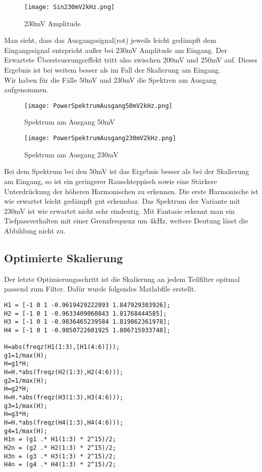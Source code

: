 \begin{figure}[H]
  \centering
    \texttt{[image: Sin230mV2kHz.png]}
  \caption{230mV Amplitude}
  \label{fig:Sin230mV2kHz}
\end{figure}
Man sieht, dass das Ausgangssignal(rot) jeweils leicht gedämpft dem Eingangssignal entspricht außer bei 230mV Amplitude am Eingang. Der Erwartete Übersteuerungseffekt tritt also zwischen 200mV und 250mV auf. Dieses Ergebnis ist bei weitem besser als im Fall der Skalierung am Eingang.\\
Wir haben für die Fälle 50mV und 230mV die Spektren am Ausgang aufgenommen.\\
\begin{figure}[H]
  \centering
    \texttt{[image: PowerSpektrumAusgang50mV2kHz.png]}
  \caption{Spektrum am Ausgang 50mV}
  \label{fig:PowerSpektrumAusgang50mV2kHz}
\end{figure}
\begin{figure}[H]
  \centering
    \texttt{[image: PowerSpektrumAusgang230mV2kHz.png]}
  \caption{Spektrum am Ausgang 230mV}
  \label{fig:PowerSpektrumAusgang230mV2kHz}
\end{figure}
Bei dem Spektrum bei den 50mV ist das Ergebnis besser als bei der Skalierung am Eingang, so ist ein geringerer Rauschteppisch sowie eine Stärkere Unterdrückung der höheren Harmonischen zu erkennen. Die erste Harmonische ist wie erwartet leicht gedämpft gut erkennbar. Das Spektrum der Variante mit 230mV ist wie erwartet nicht sehr eindeutig. Mit Fantasie erkennt man ein Tiefpassverhalten mit einer Grenzfrequenz um 4kHz, weitere Deutung lässt die Abbildung nicht zu.

\subsection{Optimierte Skalierung}
Der letzte Optimierungsschritt ist die Skalierung an jedem Teilfilter opitmal passend zum Filter.
Dafür wurde folgendes Matlabfile erstellt.\\
\begin{adjustbox}{width=\textwidth,height=\textheight,keepaspectratio}
 \begin{lstlisting}[title=optimierung.m]
 H1 = [-1 0 1 -0.9619429222893 1.847929303926];
H2 = [-1 0 1 -0.9633409060843 1.81768444585];
H3 = [-1 0 1 -0.9836465239584 1.819862361978];
H4 = [-1 0 1 -0.9850722601925 1.806715933748];

H=abs(freqz(H1(1:3),[H1(4:6)]));
g1=1/max(H);
H=g1*H;
H=H.*abs(freqz(H2(1:3),H2(4:6)));
g2=1/max(H);
H=g2*H;
H=H.*abs(freqz(H3(1:3),H3(4:6)));
g3=1/max(H);
H=g3*H;
H=H.*abs(freqz(H4(1:3),H4(4:6)));
g4=1/max(H);
H1n = (g1 .* H1(1:3) * 2^15)/2;
H2n = (g2 .* H2(1:3) * 2^15)/2;
H3n = (g3 .* H3(1:3) * 2^15)/2;
H4n = (g4 .* H4(1:3) * 2^15)/2;
\end{lstlisting}
\end{adjustbox}

